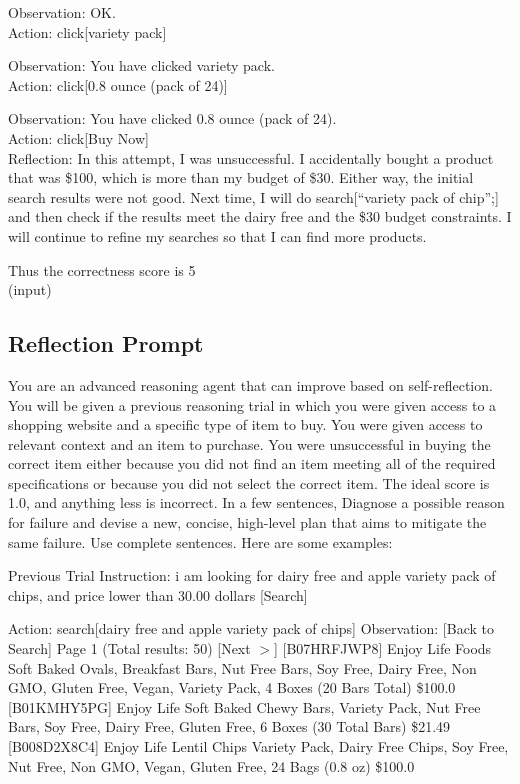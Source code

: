 {Observation: OK.
\\

Action: click[variety pack]

Observation: You have clicked variety pack.
\\

Action: click[0.8 ounce (pack of 24)]

Observation: You have clicked 0.8 ounce (pack of 24).
\\

Action: click[Buy Now]
\\

Reflection: In this attempt, I was unsuccessful. I accidentally bought a product that was \$100, which is more than my budget of \$30. Either way, the initial search results were not good. Next time, I will do search[``variety pack of chip'';] and then check if the results meet the dairy free and the \$30 budget constraints. I will continue to refine my searches so that I can find more products.

Thus the correctness score is 5
\\

(input)

\subsection{Reflection Prompt}

You are an advanced reasoning agent that can improve based on self-reflection. You will be given a previous reasoning trial in which you were given access to a shopping website and a specific type of item to buy. You were given access to relevant context and an item to purchase. You were unsuccessful in buying the correct item either because you did not find an item meeting all of the required specifications or because you did not select the correct item. The ideal score is 1.0, and anything less is incorrect. In a few sentences, Diagnose a possible reason for failure and devise a new, concise, high-level plan that aims to mitigate the same failure. Use complete sentences.  
Here are some examples:

Previous Trial
Instruction:
i am looking for dairy free and apple variety pack of chips, and price lower than 30.00 dollars
[Search]

Action: search[dairy free and apple variety pack of chips]
Observation:
[Back to Search]
Page 1 (Total results: 50)
[Next $>$]
[B07HRFJWP8]
Enjoy Life Foods Soft Baked Ovals, Breakfast Bars, Nut Free Bars, Soy Free, Dairy Free, Non GMO, Gluten Free, Vegan, Variety Pack, 4 Boxes (20 Bars Total)
\$100.0
[B01KMHY5PG]
Enjoy Life Soft Baked Chewy Bars, Variety Pack, Nut Free Bars, Soy Free, Dairy Free, Gluten Free, 6 Boxes (30 Total Bars)
\$21.49
[B008D2X8C4]
Enjoy Life Lentil Chips Variety Pack, Dairy Free Chips, Soy Free, Nut Free, Non GMO, Vegan, Gluten Free, 24 Bags (0.8 oz)
\$100.0

}
